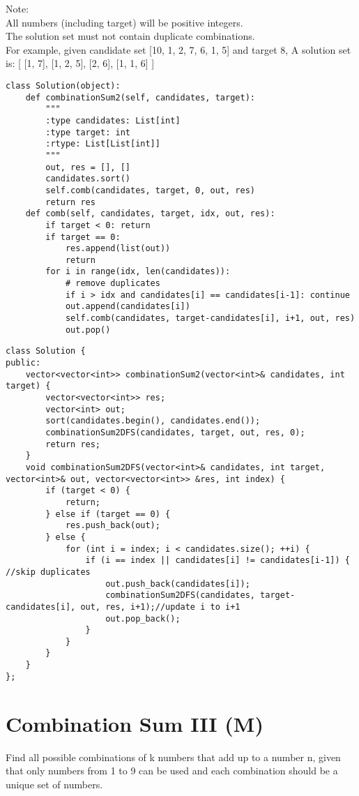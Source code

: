 Note:\\
    All numbers (including target) will be positive integers.\\
    The solution set must not contain duplicate combinations.\\

For example, given candidate set [10, 1, 2, 7, 6, 1, 5] and target 8, A solution set is: [ [1, 7], [1, 2, 5], [2, 6], [1, 1, 6] ] \\

\begin{lstlisting}
class Solution(object):
    def combinationSum2(self, candidates, target):
        """
        :type candidates: List[int]
        :type target: int
        :rtype: List[List[int]]
        """
        out, res = [], []
        candidates.sort()
        self.comb(candidates, target, 0, out, res)
        return res
    def comb(self, candidates, target, idx, out, res):
        if target < 0: return
        if target == 0:
            res.append(list(out))
            return
        for i in range(idx, len(candidates)):
            # remove duplicates
            if i > idx and candidates[i] == candidates[i-1]: continue
            out.append(candidates[i])
            self.comb(candidates, target-candidates[i], i+1, out, res)
            out.pop()
\end{lstlisting}

\begin{lstlisting}
class Solution {
public:
    vector<vector<int>> combinationSum2(vector<int>& candidates, int target) {
        vector<vector<int>> res;
        vector<int> out;
        sort(candidates.begin(), candidates.end());
        combinationSum2DFS(candidates, target, out, res, 0);
        return res;        
    }
    void combinationSum2DFS(vector<int>& candidates, int target, vector<int>& out, vector<vector<int>> &res, int index) {
        if (target < 0) {
            return;
        } else if (target == 0) {
            res.push_back(out);
        } else {
            for (int i = index; i < candidates.size(); ++i) {
                if (i == index || candidates[i] != candidates[i-1]) { //skip duplicates
                    out.push_back(candidates[i]);
                    combinationSum2DFS(candidates, target-candidates[i], out, res, i+1);//update i to i+1
                    out.pop_back();
                }
            } 
        }
    }
};
\end{lstlisting}


\section{Combination Sum III (M)}
Find all possible combinations of k numbers that add up to a number n, given that only numbers from 1 to 9 can be used and each combination should be a unique set of numbers. \\

